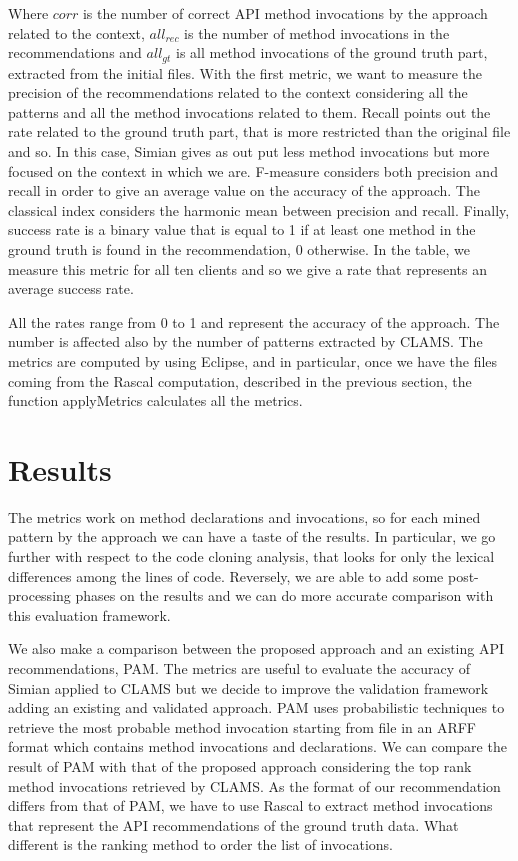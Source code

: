 Where $corr$ is the number of correct API method invocations by the approach related to the context, $all_{rec}$ is the number of method invocations in the recommendations and $all_{gt}$ is all method invocations of the ground truth part, extracted from the initial files. With the first metric, we want to measure the precision of the recommendations related to the context considering all the patterns and all the method invocations related to them. Recall points out the rate related to the ground truth part, that is more restricted than the original file and so. In this case, Simian gives as out put less method invocations but more focused on the context in which we are. F-measure considers both precision and recall in order to give an average value on the accuracy of the approach. The classical index considers the harmonic mean between precision and recall. Finally, success rate is a binary value that is equal to 1 if at least one method in the ground truth is found in the recommendation, 0 otherwise. In the table, we measure this metric for all ten clients and so we give a rate that represents an average success rate.

All the rates range from 0 to 1 and represent the accuracy of the approach. The number is affected also by the number of patterns extracted by CLAMS. The metrics are computed by using Eclipse, and in particular, once we have the files coming from the Rascal computation, described in the previous section, the function applyMetrics calculates all the metrics.








\section{Results}

The metrics work on method declarations and invocations, so for each mined pattern by the approach we can have a taste of the results. In particular, we go further with respect to the code cloning analysis, that looks for only the lexical differences among the lines of code. Reversely, we are able to add some post-processing phases on the results and we can do more accurate comparison with this evaluation framework. 

We also make a comparison between the proposed approach and an existing API recommendations, PAM. The metrics are useful to evaluate the accuracy of Simian applied to CLAMS but we decide to improve the validation framework adding an existing and validated approach. PAM uses probabilistic techniques to retrieve the most probable method invocation starting from file in an ARFF format which contains method invocations and declarations. We can compare the result of PAM with that of the proposed approach considering the top rank method invocations retrieved by CLAMS. As the format of our recommendation differs from that of PAM, we have to use Rascal to extract method invocations that represent the API recommendations of the ground truth data. What different is the ranking method to order the list of invocations. %


